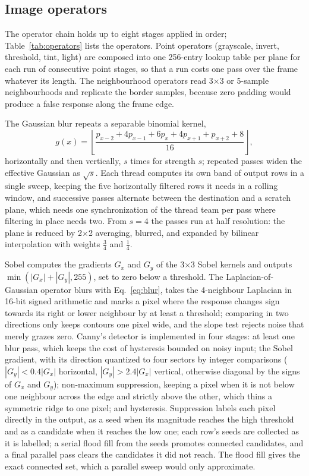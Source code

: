 \documentclass[a4paper,fleqn]{cas-sc}
\begin{document}
\subsection{Image operators}\label{sec:operators}

The operator chain holds up to eight stages applied in order; Table~\ref{tab:operators}
lists the operators. Point operators (grayscale, invert, threshold, tint, light)
are composed into one 256-entry lookup table per plane for each run of consecutive
point stages, so that a run costs one pass over the frame whatever its length. The
neighbourhood operators read 3$\times$3 or 5-sample neighbourhoods and replicate the
border samples, because zero padding would produce a false response along the frame
edge.

The Gaussian blur repeats a separable binomial kernel,
\begin{equation}\label{eq:blur}
  g(x) = \left\lfloor \frac{p_{x-2} + 4p_{x-1} + 6p_x + 4p_{x+1} + p_{x+2} + 8}{16}
  \right\rfloor ,
\end{equation}
horizontally and then vertically, $s$ times for strength $s$; repeated passes widen
the effective Gaussian as $\sqrt{s}$. Each thread computes its own band of output rows
in a single sweep, keeping the five horizontally filtered rows it needs in a rolling
window, and successive passes alternate between the destination and a scratch plane,
which needs one synchronization of the thread team per pass where filtering in place
needs two. From $s = 4$ the passes run at half resolution: the plane is reduced by
2$\times$2 averaging, blurred, and expanded by bilinear interpolation with weights
$\tfrac34$ and $\tfrac14$.

Sobel \citep{duda1973} computes the gradients $G_x$ and $G_y$ of the 3$\times$3 Sobel
kernels and outputs $\min(|G_x| + |G_y|, 255)$, set to zero below a threshold.
The Laplacian-of-Gaussian operator \citep{marr1980} blurs with
Eq.~\eqref{eq:blur}, takes the 4-neighbour Laplacian in 16-bit signed arithmetic and
marks a pixel where the response changes sign towards its right or lower neighbour by
at least a threshold; comparing in two directions only keeps contours one pixel wide,
and the slope test rejects noise that merely grazes zero. Canny's detector
\citep{canny1986} is implemented in four stages: at least one blur pass, which keeps
the cost of hysteresis bounded on noisy input; the Sobel gradient, with its direction
quantized to four sectors by integer comparisons ($|G_y| < 0.4|G_x|$ horizontal,
$|G_y| > 2.4|G_x|$ vertical, otherwise diagonal by the signs of $G_x$ and $G_y$);
non-maximum suppression, keeping a pixel when it is not below one neighbour across the
edge and strictly above the other, which thins a symmetric ridge to one pixel; and
hysteresis. Suppression labels each pixel directly in the output, as a seed when its
magnitude reaches the high threshold and as a candidate when it reaches the low one;
each row's seeds are collected as it is labelled; a serial flood fill from the seeds
promotes connected candidates, and a final parallel pass clears the candidates it did
not reach. The flood fill gives the exact connected set, which a parallel sweep would
only approximate.
\end{document}
